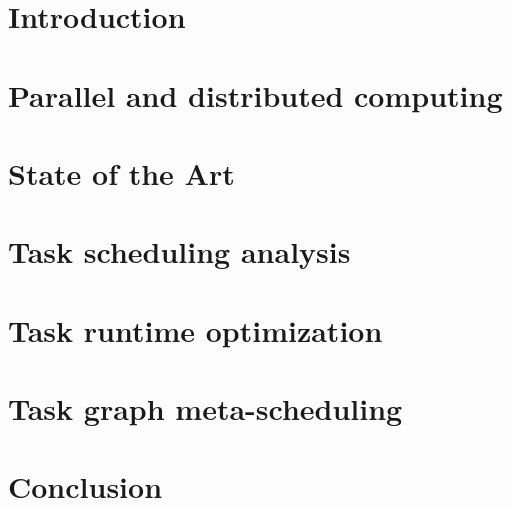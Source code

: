 \documentclass[english,phd]{diploma}
\begin{document}
\MakeTitlePages

\printglossaries

\listoffigures
\clearpage

\listoftables
\clearpage

\lstlistoflistings
\clearpage

\nocite{estee, rsds, hyperqueue, ligate}

\chapter{Introduction}
\label{ch:Introduction}


\chapter{Parallel and distributed computing}
\label{ch:distributed-computing}


\chapter{State of the Art}
\label{ch:sota}


\chapter{Task scheduling analysis}
\label{ch:estee}


\chapter{Task runtime optimization}
\label{ch:rsds}


\chapter{Task graph meta-scheduling}
\label{ch:hyperqueue}


\chapter{Conclusion}
\label{ch:conclusion}

\end{document}
